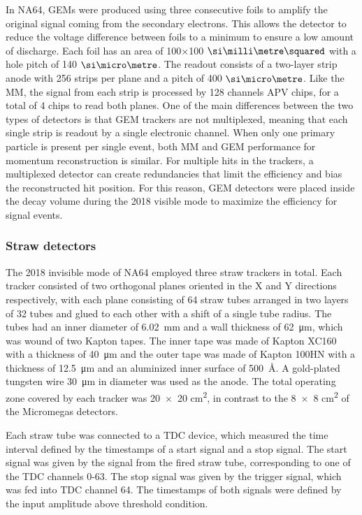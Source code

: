 In NA64, GEMs were produced using three consecutive foils to amplify the original signal coming from the secondary electrons. This allows the detector to reduce the voltage difference between foils to a minimum to ensure a low amount of discharge. Each foil has an area of 100$\times$100 $\mms$ with a hole pitch of 140 $\mum$. The readout consists of a two-layer strip anode with 256 strips per plane and a pitch of 400 $\mum$. Like the MM, the signal from each strip is processed by 128 channels APV chips, for a total of 4 chips to read both planes.
One of the main differences between the two types of detectors is that GEM trackers are not multiplexed, meaning that each single strip is readout by a single electronic channel. When only one primary particle is present per single event, both MM and GEM performance for momentum reconstruction is similar. For multiple hits in the trackers, a multiplexed detector can create redundancies that limit the efficiency and bias the reconstructed hit position. For this reason, GEM detectors were placed inside the decay volume during the 2018 visible mode to maximize the efficiency for signal events.

\subsubsection{Straw detectors}

The 2018 invisible mode of NA64 employed three straw trackers in total. Each tracker consisted of two orthogonal planes oriented in the X and Y directions respectively, with each plane consisting of 64 straw tubes arranged in two layers of 32 tubes and glued to each other with a shift of a single tube radius. The tubes had an inner diameter of \SI{6.02}{\milli\metre} and a wall thickness of \SI{62}{\micro\metre}, which was wound of two Kapton tapes. The inner tape was made of Kapton XC160 with a thickness of \SI{40}{\micro\metre} and the outer tape was made of Kapton 100HN with a thickness of \SI{12.5}{\micro\metre} and an aluminized inner surface of \SI{500}{\angstrom}. A gold-plated tungsten wire 30~μm in diameter was used as the anode. The total operating zone covered by each tracker was \num{20 x 20} \si{\square\centi\metre}, in contrast to the \num{8 x 8} \si{\square\centi\metre} of the Micromegas detectors.

Each straw tube was connected to a TDC device, which measured the time interval defined by the timestamps of a start signal and a stop signal. The start signal was given by the signal from the fired straw tube, corresponding to one of the TDC channels 0-63. The stop signal was given by the trigger signal, which was fed into TDC channel 64. The timestamps of both signals were defined by the input amplitude above threshold condition.

